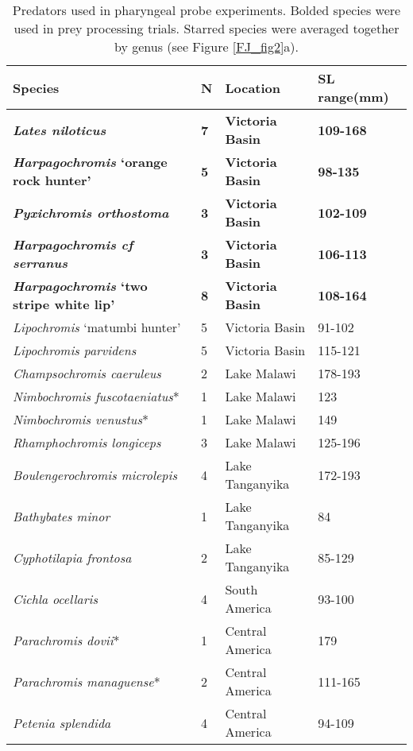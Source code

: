 \begin{table}[]
\centering
\begin{tabular}{@{}llll@{}}
\toprule
Species & N & Location & SL range(mm) \\ \midrule
\textit{\textbf{Lates niloticus}} & \textbf{7} & \textbf{Victoria Basin} & \textbf{109-168} \\
\textbf{\textit{Harpagochromis} `orange rock hunter'} & \textbf{5} & \textbf{Victoria Basin} & \textbf{98-135} \\
\textit{\textbf{Pyxichromis orthostoma}} & \textbf{3} & \textbf{Victoria Basin} & \textbf{102-109} \\
\textit{\textbf{Harpagochromis cf serranus}} & \textbf{3} & \textbf{Victoria Basin} & \textbf{106-113} \\
\textbf{\textit{Harpagochromis} `two stripe white lip'} & \textbf{8} & \textbf{Victoria Basin} & \textbf{108-164} \\
\textit{Lipochromis} `matumbi hunter' & 5 & Victoria Basin & 91-102 \\
\textit{Lipochromis parvidens} & 5 & Victoria Basin & 115-121 \\
\textit{Champsochromis caeruleus} & 2 & Lake Malawi & 178-193 \\
\textit{Nimbochromis fuscotaeniatus}* & 1 & Lake Malawi & 123 \\
\textit{Nimbochromis venustus}* & 1 & Lake Malawi & 149 \\
\textit{Rhamphochromis longiceps} & 3 & Lake Malawi & 125-196 \\
\textit{Boulengerochromis microlepis} & 4 & Lake Tanganyika & 172-193 \\
\textit{Bathybates minor} & 1 & Lake Tanganyika & 84 \\
\textit{Cyphotilapia frontosa} & 2 & Lake Tanganyika & 85-129 \\
\textit{Cichla ocellaris} & 4 & South America & 93-100 \\
\textit{Parachromis dovii}* & 1 & Central America & 179 \\
\textit{Parachromis managuense}* & 2 & Central America & 111-165 \\
\textit{Petenia splendida} & 4 & Central America & 94-109 \\ \bottomrule
\end{tabular}
\caption{Predators used in pharyngeal probe experiments. Bolded species were used in prey processing trials. Starred species were averaged together by genus (see Figure \ref{FJ_fig2}a).}
\label{FJ_table2}
\end{table}